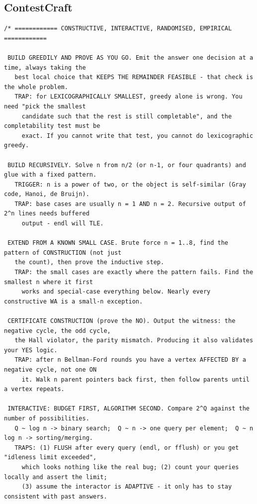 \documentclass[9pt,a4paper,twocolumn]{extarticle}
\begin{document}
\subsection{ContestCraft}
\nopagebreak
\begin{lstlisting}
/* ============ CONSTRUCTIVE, INTERACTIVE, RANDOMISED, EMPIRICAL ============

 BUILD GREEDILY AND PROVE AS YOU GO. Emit the answer one decision at a time, always taking the
   best local choice that KEEPS THE REMAINDER FEASIBLE - that check is the whole problem.
   TRAP: for LEXICOGRAPHICALLY SMALLEST, greedy alone is wrong. You need "pick the smallest
     candidate such that the rest is still completable", and the completability test must be
     exact. If you cannot write that test, you cannot do lexicographic greedy.

 BUILD RECURSIVELY. Solve n from n/2 (or n-1, or four quadrants) and glue with a fixed pattern.
   TRIGGER: n is a power of two, or the object is self-similar (Gray code, Hanoi, de Bruijn).
   TRAP: base cases are usually n = 1 AND n = 2. Recursive output of 2^n lines needs buffered
     output - endl will TLE.

 EXTEND FROM A KNOWN SMALL CASE. Brute force n = 1..8, find the pattern of CONSTRUCTION (not just
   the count), then prove the inductive step.
   TRAP: the small cases are exactly where the pattern fails. Find the smallest n where it first
     works and special-case everything below. Nearly every constructive WA is a small-n exception.

 CERTIFICATE CONSTRUCTION (prove the NO). Output the witness: the negative cycle, the odd cycle,
   the Hall violator, the parity mismatch. Producing it also validates your YES logic.
   TRAP: after n Bellman-Ford rounds you have a vertex AFFECTED BY a negative cycle, not one ON
     it. Walk n parent pointers back first, then follow parents until a vertex repeats.

 INTERACTIVE: BUDGET FIRST, ALGORITHM SECOND. Compare 2^Q against the number of possibilities.
   Q ~ log n -> binary search;  Q ~ n -> one query per element;  Q ~ n log n -> sorting/merging.
   TRAPS: (1) FLUSH after every query (endl, or fflush) or you get "idleness limit exceeded",
     which looks nothing like the real bug; (2) count your queries locally and assert the limit;
     (3) assume the interactor is ADAPTIVE - it only has to stay consistent with past answers.


\end{lstlisting}
\end{document}
